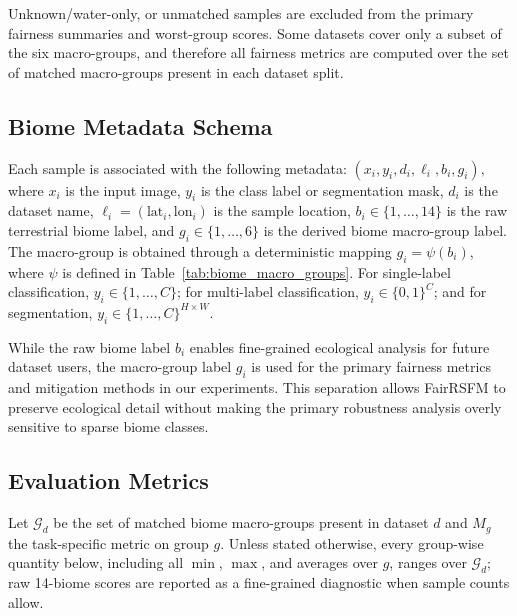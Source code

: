 \documentclass[10pt,twocolumn,letterpaper]{article}
\newcommand{\method}{FairRSFM\xspace}
\begin{document}
Unknown/water-only, or unmatched samples are excluded from the primary fairness summaries and worst-group scores. Some datasets cover only a subset of the six macro-groups, and therefore all fairness metrics are computed over the set of matched macro-groups present in each dataset split.


\subsection{Biome Metadata Schema}

Each sample is associated with the following metadata: $(x_i, y_i, d_i, \ell_i, b_i, g_i),$ where \(x_i\) is the input image, \(y_i\) is the class label or segmentation mask, \(d_i\) is the dataset name, \(\ell_i=(\mathrm{lat}_i,\mathrm{lon}_i)\) is the sample location, \(b_i\in\{1,\ldots,14\}\) is the raw terrestrial biome label, and \(g_i\in\{1,\ldots,6\}\) is the derived biome macro-group label. The macro-group is obtained through a deterministic mapping \(g_i=\psi(b_i)\), where \(\psi\) is defined in Table~\ref{tab:biome_macro_groups}. For single-label classification, \(y_i\in\{1,\ldots,C\}\); for multi-label classification, \(y_i\in\{0,1\}^{C}\); and for segmentation, \(y_i \in \{1,\ldots,C\}^{H\times W}\).

While the raw biome label \(b_i\) enables fine-grained ecological analysis for future dataset users, the macro-group label \(g_i\) is used for the primary fairness metrics and mitigation methods in our experiments. This separation allows \method to preserve ecological detail without making the primary robustness analysis overly sensitive to sparse biome classes.



\subsection{Evaluation Metrics}
Let $\mathcal{G}_d$ be the set of matched biome macro-groups present in dataset $d$ and $M_g$ the task-specific metric on group $g$. Unless stated otherwise, every group-wise quantity below, including all $\min$, $\max$, and averages over $g$, ranges over $\mathcal{G}_d$; raw 14-biome scores are reported as a fine-grained diagnostic when sample counts allow.
\end{document}
